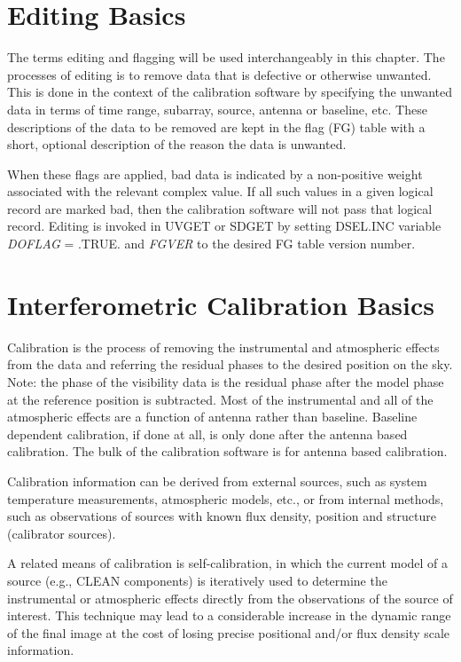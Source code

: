 \section{Editing Basics }
The terms editing and flagging will be used interchangeably in this
chapter.  The processes of editing is to remove data that is defective
or otherwise unwanted.  This is done in the context of the calibration
software by specifying the unwanted data in terms of time range,
subarray, source, antenna or baseline, etc.  These descriptions of the
data to be removed are kept in the flag (FG) table with a short,
optional description of the reason the data is unwanted.

When these flags are applied, bad data is indicated by a non-positive
weight associated with the relevant complex value.  If all such values
in a given logical record are marked bad, then the calibration
software will not pass that logical record.  Editing is invoked in
UVGET or SDGET by setting
DSEL.INC variable {\it DOFLAG} = .TRUE. and {\it
FGVER} to the desired FG table version number.

\section{Interferometric Calibration Basics }
Calibration is the process of removing the instrumental and
atmospheric effects from the data and referring the residual phases to
the desired position on the sky.  Note: the phase of the visibility
data is the residual phase after the model phase at the reference
position is subtracted.  Most of the instrumental and all of the
atmospheric effects are a function of antenna rather than baseline.
Baseline dependent calibration, if done at all, is only done after the
antenna based calibration.  The bulk of the calibration software is
for antenna based calibration.

Calibration information can be derived from external sources, such as
system temperature measurements, atmospheric models, etc., or from
internal methods, such as observations of sources with known flux
density, position and structure (calibrator sources).

A related means of calibration is self-calibration, in which the
current model of a source (e.g., CLEAN components) is iteratively used
to determine the instrumental or atmospheric effects directly from the
observations of the source of interest.  This technique may lead to a
considerable increase in the dynamic range of the final image at the
cost of losing precise positional and/or flux density scale
information.

